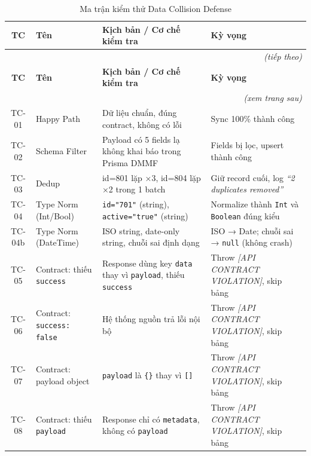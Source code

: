 \begin{longtable}{cp{3cm}p{5cm}p{4.5cm}}
\caption{Ma trận kiểm thử Data Collision Defense}
\label{tab:collision-testcases} \\
\toprule
\textbf{TC} & \textbf{Tên} & \textbf{Kịch bản / Cơ chế kiểm tra} & \textbf{Kỳ vọng} \\
\midrule
\endfirsthead
\multicolumn{4}{r}{\textit{(tiếp theo)}} \\
\toprule
\textbf{TC} & \textbf{Tên} & \textbf{Kịch bản / Cơ chế kiểm tra} & \textbf{Kỳ vọng} \\
\midrule
\endhead
\midrule
\multicolumn{4}{r}{\textit{(xem trang sau)}} \\
\endfoot
\bottomrule
\endlastfoot

TC-01 & Happy Path
  & Dữ liệu chuẩn, đúng contract, không có lỗi
  & Sync 100\% thành công \\[4pt]

TC-02 & Schema Filter
  & Payload có 5 fields lạ không khai báo trong Prisma DMMF
  & Fields bị lọc, upsert thành công \\[4pt]

TC-03 & Dedup
  & id=801 lặp ×3, id=804 lặp ×2 trong 1 batch
  & Giữ record cuối, log \textit{``2 duplicates removed''} \\[4pt]

TC-04 & Type Norm (Int/Bool)
  & \texttt{id="701"} (string), \texttt{active="true"} (string)
  & Normalize thành \texttt{Int} và \texttt{Boolean} đúng kiểu \\[4pt]

TC-04b & Type Norm (DateTime)
  & ISO string, date-only string, chuỗi sai định dạng
  & ISO → Date; chuỗi sai → \texttt{null} (không crash) \\[4pt]

TC-05 & Contract: thiếu \texttt{success}
  & Response dùng key \texttt{data} thay vì \texttt{payload}, thiếu \texttt{success}
  & Throw \textit{[API CONTRACT VIOLATION]}, skip bảng \\[4pt]

TC-06 & Contract: \texttt{success: false}
  & Hệ thống nguồn trả lỗi nội bộ
  & Throw \textit{[API CONTRACT VIOLATION]}, skip bảng \\[4pt]

TC-07 & Contract: payload object
  & \texttt{payload} là \texttt{\{\}} thay vì \texttt{[]}
  & Throw \textit{[API CONTRACT VIOLATION]}, skip bảng \\[4pt]

TC-08 & Contract: thiếu \texttt{payload}
  & Response chỉ có \texttt{metadata}, không có \texttt{payload}
  & Throw \textit{[API CONTRACT VIOLATION]}, skip bảng \\[4pt]


\end{longtable}
